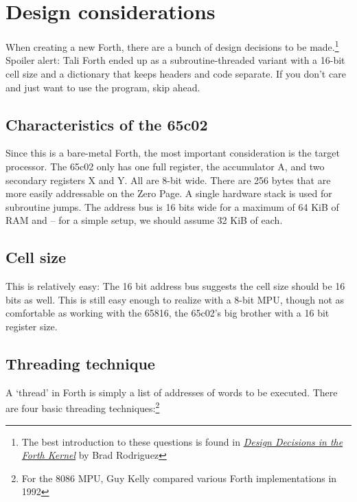 
\section{Design considerations}

When creating a new Forth, there are a bunch of design decisions to be
made.\footnote{The best introduction to these questions is found in
\href{http://www.bradrodriguez.com/papers/moving1.htm}{\textit{Design Decisions
in the Forth Kernel}} by Brad Rodriguez} Spoiler alert:
Tali Forth ended up as a subroutine-threaded variant with a 16-bit cell size and
a dictionary that keeps headers and code separate. If you don't care and just
want to use the program, skip ahead. 

\subsection{Characteristics of the 65c02}

Since this is a bare-metal Forth, the most important consideration is the target
processor. The 65c02 only has one full register, the accumulator
A, and two secondary registers X and
Y. All are 8-bit wide. There are 256 bytes that are more
easily addressable on the Zero Page. A single hardware stack is
used for subroutine jumps. The address bus is 16 bits wide
for a maximum of 64 KiB of RAM and  -- for a simple setup,
we should assume 32 KiB of each. 

\subsection{Cell size}

This is relatively easy: The 16 bit address bus suggests the
cell size should be 16 bits as well. This is still easy enough to realize with a
8-bit MPU, though not as comfortable as working with the 65816, the
65c02's big brother with a 16 bit register size.

\subsection{Threading technique}

A `thread' in Forth is simply a list of addresses of words to be executed. 
There are four basic threading techniques:\footnote{For the 8086 MPU, Guy
Kelly compared various Forth implementations in
1992\cite{kelly92}}

